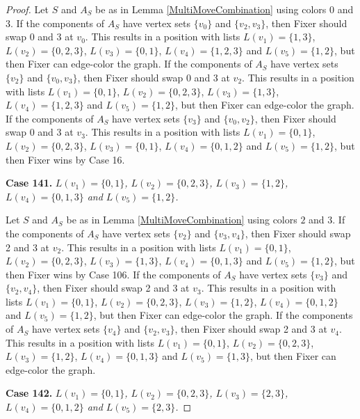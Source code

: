 \documentclass[12pt]{amsart}
\theoremstyle{plain}
\theoremstyle{definition}
\theoremstyle{remark}
\begin{document}
\begin{proof}
Let $S$ and $A_S$ be as in Lemma \ref{MultiMoveCombination} using colors $0$ and $3$. If the components of $A_S$ have vertex sets $\{v_0\}$ and $\{v_2, v_3\}$, then Fixer should swap 0 and 3 at $v_0$. This results in a position with lists $L(v_1) = \{1, 3\}$, $L(v_2) = \{0, 2, 3\}$, $L(v_3) = \{0, 1\}$, $L(v_4) = \{1, 2, 3\}$ and $L(v_5) = \{1, 2\}$, but then Fixer can edge-color the graph.
If the components of $A_S$ have vertex sets $\{v_2\}$ and $\{v_0, v_3\}$, then Fixer should swap 0 and 3 at $v_2$. This results in a position with lists $L(v_1) = \{0, 1\}$, $L(v_2) = \{0, 2, 3\}$, $L(v_3) = \{1, 3\}$, $L(v_4) = \{1, 2, 3\}$ and $L(v_5) = \{1, 2\}$, but then Fixer can edge-color the graph.
If the components of $A_S$ have vertex sets $\{v_3\}$ and $\{v_0, v_2\}$, then Fixer should swap 0 and 3 at $v_3$. This results in a position with lists $L(v_1) = \{0, 1\}$, $L(v_2) = \{0, 2, 3\}$, $L(v_3) = \{0, 1\}$, $L(v_4) = \{0, 1, 2\}$ and $L(v_5) = \{1, 2\}$, but then Fixer wins by Case 16.

\noindent\textbf{Case 141.  }\textit{$L(v_1) = \{0, 1\}$, $L(v_2) = \{0, 2, 3\}$, $L(v_3) = \{1, 2\}$, $L(v_4) = \{0, 1, 3\}$ and $L(v_5) = \{1, 2\}$.}

Let $S$ and $A_S$ be as in Lemma \ref{MultiMoveCombination} using colors $2$ and $3$. If the components of $A_S$ have vertex sets $\{v_2\}$ and $\{v_3, v_4\}$, then Fixer should swap 2 and 3 at $v_2$. This results in a position with lists $L(v_1) = \{0, 1\}$, $L(v_2) = \{0, 2, 3\}$, $L(v_3) = \{1, 3\}$, $L(v_4) = \{0, 1, 3\}$ and $L(v_5) = \{1, 2\}$, but then Fixer wins by Case 106.
If the components of $A_S$ have vertex sets $\{v_3\}$ and $\{v_2, v_4\}$, then Fixer should swap 2 and 3 at $v_3$. This results in a position with lists $L(v_1) = \{0, 1\}$, $L(v_2) = \{0, 2, 3\}$, $L(v_3) = \{1, 2\}$, $L(v_4) = \{0, 1, 2\}$ and $L(v_5) = \{1, 2\}$, but then Fixer can edge-color the graph.
If the components of $A_S$ have vertex sets $\{v_4\}$ and $\{v_2, v_3\}$, then Fixer should swap 2 and 3 at $v_4$. This results in a position with lists $L(v_1) = \{0, 1\}$, $L(v_2) = \{0, 2, 3\}$, $L(v_3) = \{1, 2\}$, $L(v_4) = \{0, 1, 3\}$ and $L(v_5) = \{1, 3\}$, but then Fixer can edge-color the graph.

\noindent\textbf{Case 142.  }\textit{$L(v_1) = \{0, 1\}$, $L(v_2) = \{0, 2, 3\}$, $L(v_3) = \{2, 3\}$, $L(v_4) = \{0, 1, 2\}$ and $L(v_5) = \{2, 3\}$.}


\end{proof}
\end{document}
